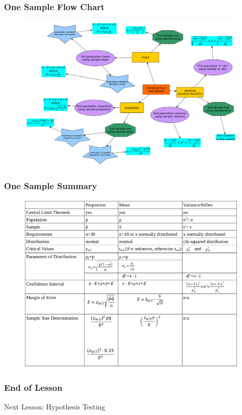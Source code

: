 \documentclass[xcolor=dvipsnames]{beamer}
\begin{document}
\begin{frame}
  \frametitle{One Sample Flow Chart}
  \begin{figure}[h]
    \includegraphics[scale=0.255]{./diagrams/onesample.pdf}
  \end{figure}
\end{frame}

\begin{frame}
  \frametitle{One Sample Summary}
  \begin{figure}[h]
    \includegraphics[scale=0.255]{./diagrams/fs-OneSample-summary.png}
  \end{figure}
\end{frame}

\begin{frame}
  \frametitle{End of Lesson}
Next Lesson: Hypothesis Testing 
\end{frame}
\end{document}
